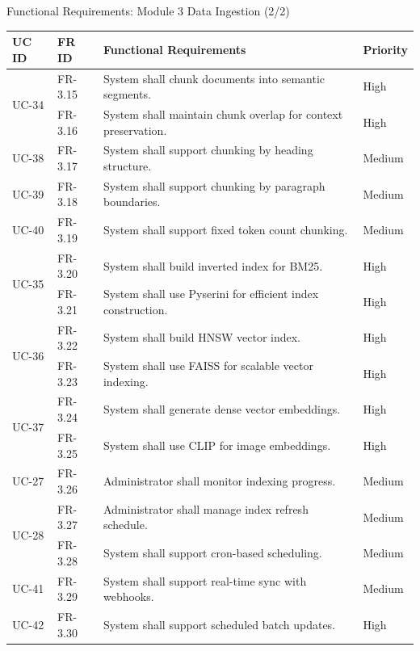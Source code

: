 \documentclass[aspectratio=169,xcolor=dvipsnames]{beamer}
\begin{document}
\begin{frame}{Functional Requirements: Module 3 Data Ingestion (2/2)}
    \tiny
    \renewcommand{\arraystretch}{0.64}
    \begin{table}
        \centering
        \begin{tabular}{p{}|p{}|p{}|p{}}
        \toprule
        \textbf{UC ID} & \textbf{FR ID} & \textbf{Functional Requirements} & \textbf{Priority} \\
        \midrule
        \multirow{2}{*}{UC-34} & FR-3.15 & System shall chunk documents into semantic segments. & High \\
        & FR-3.16 & System shall maintain chunk overlap for context preservation. & High \\
        \midrule
        UC-38 & FR-3.17 & System shall support chunking by heading structure. & Medium \\
        \midrule
        UC-39 & FR-3.18 & System shall support chunking by paragraph boundaries. & Medium \\
        \midrule
        UC-40 & FR-3.19 & System shall support fixed token count chunking. & Medium \\
        \midrule
        \multirow{2}{*}{UC-35} & FR-3.20 & System shall build inverted index for BM25. & High \\
        & FR-3.21 & System shall use Pyserini for efficient index construction. & High \\
        \midrule
        \multirow{2}{*}{UC-36} & FR-3.22 & System shall build HNSW vector index. & High \\
        & FR-3.23 & System shall use FAISS for scalable vector indexing. & High \\
        \midrule
        \multirow{2}{*}{UC-37} & FR-3.24 & System shall generate dense vector embeddings. & High \\
        & FR-3.25 & System shall use CLIP for image embeddings. & High \\
        \midrule
        UC-27 & FR-3.26 & Administrator shall monitor indexing progress. & Medium \\
        \midrule
        \multirow{2}{*}{UC-28} & FR-3.27 & Administrator shall manage index refresh schedule. & Medium \\
        & FR-3.28 & System shall support cron-based scheduling. & Medium \\
        \midrule
        UC-41 & FR-3.29 & System shall support real-time sync with webhooks. & Medium \\
        \midrule
        UC-42 & FR-3.30 & System shall support scheduled batch updates. & High \\
        \bottomrule
        \end{tabular}
    \end{table}
\end{frame}
\end{document}
